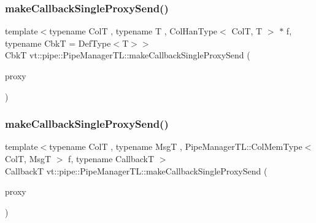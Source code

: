 \mbox{\label{structvt_1_1pipe_1_1_pipe_manager_t_l_a2c8c3a5aca22b2526fe68dd543a8a888}} 
\subsubsection{\texorpdfstring{make\+Callback\+Single\+Proxy\+Send()}{makeCallbackSingleProxySend()}\hspace{0.1cm}{\footnotesize\ttfamily [1/3]}}
{\footnotesize\ttfamily template$<$typename ColT , typename T , Col\+Han\+Type$<$ Col\+T, T $>$ $\ast$ f, typename CbkT  = Def\+Type$<$\+T$>$$>$ \\
CbkT vt\+::pipe\+::\+Pipe\+Manager\+T\+L\+::make\+Callback\+Single\+Proxy\+Send (\begin{DoxyParamCaption}\item[{typename Col\+T\+::\+Proxy\+Type}]{proxy }\end{DoxyParamCaption})}

\mbox{\label{structvt_1_1pipe_1_1_pipe_manager_t_l_a0da1b385495f0a625754f17db45a4066}} 
\subsubsection{\texorpdfstring{make\+Callback\+Single\+Proxy\+Send()}{makeCallbackSingleProxySend()}\hspace{0.1cm}{\footnotesize\ttfamily [2/3]}}
{\footnotesize\ttfamily template$<$typename ColT , typename MsgT , Pipe\+Manager\+T\+L\+::\+Col\+Mem\+Type$<$ Col\+T, Msg\+T $>$ f, typename CallbackT $>$ \\
CallbackT vt\+::pipe\+::\+Pipe\+Manager\+T\+L\+::make\+Callback\+Single\+Proxy\+Send (\begin{DoxyParamCaption}\item[{typename Col\+T\+::\+Proxy\+Type}]{proxy }\end{DoxyParamCaption})}

